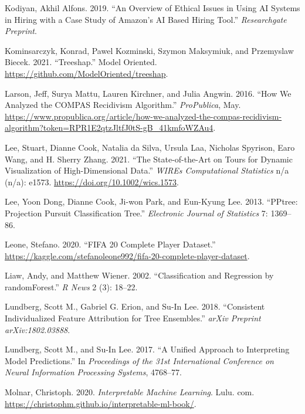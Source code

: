 \documentclass[11pt,twoside]{article}
\newlength{\cslhangindent}
\newlength{\cslentryspacingunit} %
\newenvironment{CSLReferences}[2] %
 {%
  \setlength{\parindent}{0pt}
  \ifodd #1
  \let\oldpar\par
  \def\par{\hangindent=\cslhangindent\oldpar}
  \fi
  \setlength{\parskip}{#2\cslentryspacingunit}
 }%
 {}
\begin{document}
\begin{CSLReferences}{1}{0}
\leavevmode\hypertarget{ref-kodiyan_overview_2019}{}%
Kodiyan, Akhil Alfons. 2019. {``An Overview of Ethical Issues in Using {AI} Systems in Hiring with a Case Study of {Amazon}'s {AI} Based Hiring Tool.''} \emph{Researchgate Preprint}.

\leavevmode\hypertarget{ref-kominsarczyk_treeshap_2021}{}%
Kominsarczyk, Konrad, Pawel Kozminski, Szymon Maksymiuk, and Przemyslaw Biecek. 2021. {``Treeshap.''} Model Oriented. \url{https://github.com/ModelOriented/treeshap}.

\leavevmode\hypertarget{ref-larson_how_2016}{}%
Larson, Jeff, Surya Mattu, Lauren Kirchner, and Julia Angwin. 2016. {``How {We} {Analyzed} the {COMPAS} {Recidivism} {Algorithm}.''} \emph{ProPublica}, May. \url{https://www.propublica.org/article/how-we-analyzed-the-compas-recidivism-algorithm?token=RPR1E2qtzJltfJ0tS-gB_41kmfoWZAu4}.

\leavevmode\hypertarget{ref-lee_state_2021}{}%
Lee, Stuart, Dianne Cook, Natalia da Silva, Ursula Laa, Nicholas Spyrison, Earo Wang, and H. Sherry Zhang. 2021. {``The State-of-the-Art on Tours for Dynamic Visualization of High-Dimensional Data.''} \emph{WIREs Computational Statistics} n/a (n/a): e1573. \url{https://doi.org/10.1002/wics.1573}.

\leavevmode\hypertarget{ref-lee_pptree_2013}{}%
Lee, Yoon Dong, Dianne Cook, Ji-won Park, and Eun-Kyung Lee. 2013. {``{PPtree}: {Projection} Pursuit Classification Tree.''} \emph{Electronic Journal of Statistics} 7: 1369--86.

\leavevmode\hypertarget{ref-leone_fifa_2020}{}%
Leone, Stefano. 2020. {``{FIFA} 20 Complete Player Dataset.''} \url{https://kaggle.com/stefanoleone992/fifa-20-complete-player-dataset}.

\leavevmode\hypertarget{ref-liaw_classification_2002}{}%
Liaw, Andy, and Matthew Wiener. 2002. {``Classification and Regression by {randomForest}.''} \emph{R News} 2 (3): 18--22.

\leavevmode\hypertarget{ref-lundberg_consistent_2018}{}%
Lundberg, Scott M., Gabriel G. Erion, and Su-In Lee. 2018. {``Consistent Individualized Feature Attribution for Tree Ensembles.''} \emph{arXiv Preprint arXiv:1802.03888}.

\leavevmode\hypertarget{ref-lundberg_unified_2017}{}%
Lundberg, Scott M., and Su-In Lee. 2017. {``A Unified Approach to Interpreting Model Predictions.''} In \emph{Proceedings of the 31st International Conference on Neural Information Processing Systems}, 4768--77.

\leavevmode\hypertarget{ref-molnar_interpretable_2020}{}%
Molnar, Christoph. 2020. \emph{Interpretable Machine Learning}. Lulu. com. \url{https://christophm.github.io/interpretable-ml-book/}.


\end{CSLReferences}
\end{document}
